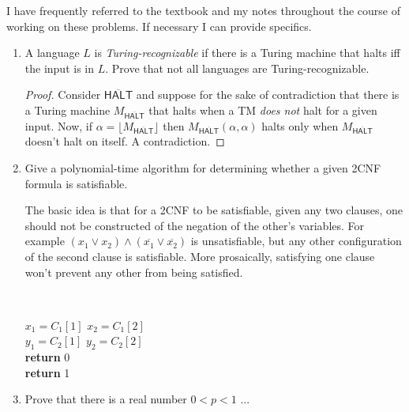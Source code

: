 \documentclass[usletter]{article}
\newcommand{\halt}[0]{
  \overline{\textsf{HALT}}
}
\begin{document}

I have frequently referred to the textbook \cite{textbook} and my notes throughout the course of working on these problems. If necessary I can provide specifics.

\begin{enumerate}
  \item A language $L$ is \textit{Turing-recognizable} if there is a Turing machine that halts iff the input is in $L$. Prove that not all languages are Turing-recognizable.
    \begin{proof}
      Consider $\halt$ and suppose for the sake of contradiction that there is a Turing machine $M_{\halt}$ that halts when a TM \textit{does not} halt for a given input. Now, if $\alpha = \lfloor M_{\halt} \rfloor $ then $M_{\halt}(\alpha, \alpha)$ halts only when $M_{\halt}$ doesn't halt on itself. A contradiction.
    \end{proof}

  \item Give a polynomial-time algorithm for determining whether a given 2CNF formula is satisfiable.

    The basic idea is that for a 2CNF to be satisfiable, given any two clauses, one should not be constructed of the negation of the other's variables. For example $(x_1 \lor x_2 ) \land (\overline{x_1} \lor \overline{x_2})$ is unsatisfiable, but any other configuration of the second clause is satisfiable. More prosaically, satisfying one clause won't prevent any other from being satisfied.

    \\

    \begin{algorithm}
      \begin{algorithmic}[1]
        \State $x_1 = C_1[1]$
        \State $x_2 = C_1[2]$ \\
        \State $y_1 = C_2[1]$
        \State $y_2 = C_2[2]$ \\
        \State \textbf{return} 0
        \EndIf
        \EndFor
        \EndFor \\
        \State \textbf{return} 1
        \EndProcedure
      \end{algorithmic}
    \end{algorithm}

  \item Prove that there is a real number $0 < p < 1$ ...


\end{enumerate}
\end{document}
